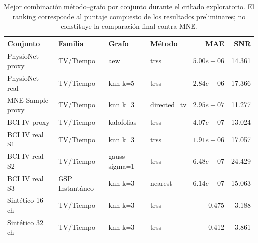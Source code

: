 \begin{table}[htbp]
\centering
\scriptsize
\setlength{\tabcolsep}{3pt}
\caption{Mejor combinación método--grafo por conjunto durante el cribado exploratorio. El ranking corresponde al puntaje compuesto de los resultados preliminares; no constituye la comparación final contra MNE.}
\label{tab:ch4_preliminary_screening_top_candidates}
\begin{tabular}{@{}p{2.2cm}p{1.85cm}p{2.4cm}p{1.85cm}rr@{}}
\toprule
Conjunto & Familia & Grafo & Método & MAE & SNR \\
\midrule
PhysioNet proxy & TV/Tiempo & aew & trss & $5.00e-06$ & 14.361 \\
PhysioNet real & TV/Tiempo & knn k=5 & trss & $2.84e-06$ & 17.366 \\
MNE Sample proxy & TV/Tiempo & knn k=3 & directed\_tv & $2.95e-07$ & 11.277 \\
BCI IV proxy & TV/Tiempo & kalofolias & trss & $4.07e-07$ & 13.024 \\
BCI IV real S1 & TV/Tiempo & knn k=3 & trss & $1.91e-06$ & 17.057 \\
BCI IV real S2 & TV/Tiempo & gauss sigma=1 & trss & $6.48e-07$ & 24.429 \\
BCI IV real S3 & GSP Instantáneo & knn k=3 & nearest & $6.14e-07$ & 15.063 \\
Sintético 16 ch & TV/Tiempo & knn k=3 & trss & 0.475 & 3.188 \\
Sintético 32 ch & TV/Tiempo & knn k=3 & trss & 0.412 & 3.861 \\
\bottomrule
\end{tabular}
\end{table}
